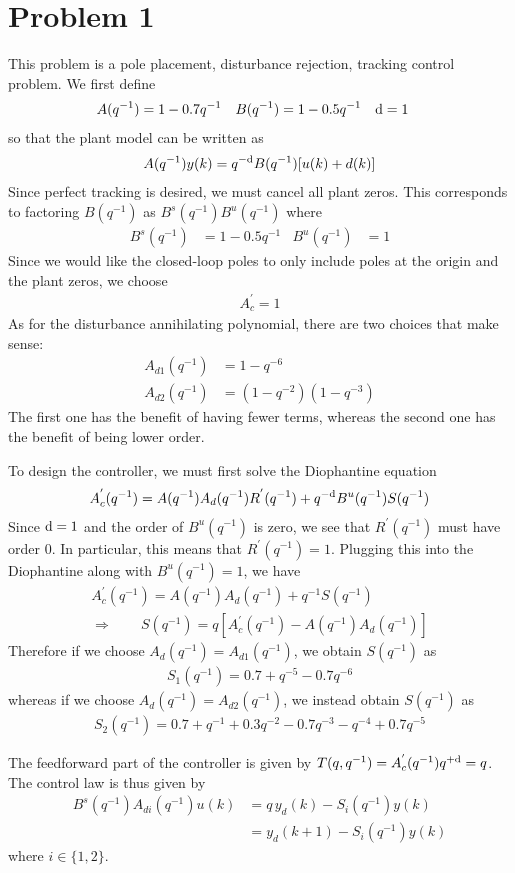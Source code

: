 \section*{Problem 1}

This problem is a pole placement, disturbance rejection, tracking control problem. We first define
\begin{align*}
    A(q^{-1}) & = 1 - 0.7 q^{-1}
        & B(q^{-1}) & = 1 - 0.5 q^{-1}
        & \textrm{d} & = 1
\end{align*}
so that the plant model can be written as
\begin{align*}
    A(q^{-1}) y(k) = q^{-\textrm{d}} B(q^{-1}) [u(k) + d(k)]
\end{align*}
Since perfect tracking is desired, we must cancel all plant zeros. This corresponds to factoring $B(q^{-1})$ as $B^s(q^{-1}) B^u(q^{-1})$ where
\begin{align*}
    B^s(q^{-1}) & = 1 - 0.5 q^{-1}
        & B^u(q^{-1}) & = 1
\end{align*}
Since we would like the closed-loop poles to only include poles at the origin and the plant zeros, we choose
\begin{align*}
    A_c^{'} = 1
\end{align*}
As for the disturbance annihilating polynomial, there are two choices that make sense:
\begin{align*}
    A_{d1}(q^{-1}) & = 1 - q^{-6} \\
        A_{d2}(q^{-1}) & = (1 - q^{-2})(1-q^{-3})
\end{align*}
The first one has the benefit of having fewer terms, whereas the second one has the benefit of being lower order.

To design the controller, we must first solve the Diophantine equation
\begin{align*}
    A_c^{'}(q^{-1}) = A(q^{-1}) A_d(q^{-1}) R^{'}(q^{-1}) + q^{-\textrm{d}} B^u(q^{-1}) S(q^{-1})
\end{align*}
Since $\textrm{d} = 1$ and the order of $B^u(q^{-1})$ is zero, we see that $R^{'}(q^{-1})$ must have order 0. In particular, this means that $R^{'}(q^{-1}) = 1$. Plugging this into the Diophantine along with $B^u(q^{-1}) = 1$, we have
\begin{gather*}
    A_c^{'}(q^{-1}) = A(q^{-1}) A_d(q^{-1}) + q^{-1} S(q^{-1}) \\
    \Rightarrow \qquad S(q^{-1}) = q [A_c^{'}(q^{-1}) - A(q^{-1}) A_d(q^{-1})]
\end{gather*}
Therefore if we choose $A_d(q^{-1}) = A_{d1}(q^{-1})$, we obtain $S(q^{-1})$ as
\begin{align*}
    S_1(q^{-1}) = 0.7 + q^{-5} - 0.7 q^{-6}
\end{align*}
whereas if we choose $A_d(q^{-1}) = A_{d2}(q^{-1})$, we instead obtain $S(q^{-1})$ as
\begin{align*}
    S_2(q^{-1}) = 0.7 + q^{-1} + 0.3 q^{-2} - 0.7 q^{-3} - q^{-4} + 0.7 q^{-5}
\end{align*}

The feedforward part of the controller is given by $T(q,q^{-1}) = A_c^{'}(q^{-1}) q^{+\textrm{d}} = q$. The control law is thus given by
\begin{align*}
    B^s(q^{-1}) A_{di}(q^{-1}) u(k) & = q \, y_d(k) - S_i(q^{-1}) y(k) \\
    & = y_d(k+1) - S_i(q^{-1}) y(k)
\end{align*}
where $i \in \{1,2\}$.

